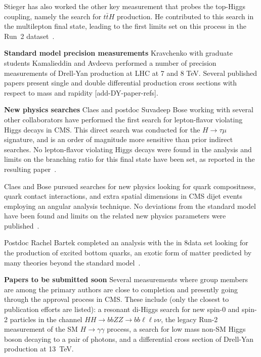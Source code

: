 Stieger has also worked the other key measurement that probes the top-Higgs
coupling, namely the search for $t\bar{t}H$ production.  He contributed to
this search in the multilepton final state, leading to the first limits set
on this process in the Run~2 dataset~\cite{bib:ttHmultilep}.

{\bf Standard model precision measurements} Kravchenko with graduate students Kamalieddin and Avdeeva performed a number of precision measurements of Drell-Yan production at LHC at 7 and 8 TeV. Several published papers present single and double differential production cross sections with respect to mass and rapidity [add-DY-paper-refs].

{\bf New physics searches}
Claes and postdoc Suvadeep Bose working with several other collaborators have performed the first search for lepton-flavor violating Higgs decays in CMS. This direct search was conducted for the $H\rightarrow \tau\mu$ signature, and is an order of magnitude more sensitive than prior indirect searches. No lepton-flavor violating Higgs decays were found in the analysis and limits on the branching ratio for this final state have been set, as reported in the resulting paper~\cite{bib:higgs-LFV}.

Claes and Bose pursued searches for new physics looking for quark compositness, quark contact interactions, and extra spatial dimensions in CMS dijet events employing an angular analysis technique. No deviations from the standard model have been found and limits on the related new physics parameters were published~\cite{bib:quark-compositness-etc}.

Postdoc Rachel Bartek completed an analysis with the in 8\TeV data set looking for the production of excited bottom quarks, an exotic form of matter predicted by many theories beyond the standard model~\cite{bib:bstar}. 

{\bf Papers to be submitted soon} Several measurements where group members are among the primary authors are close to completion and presently going through the approval process in CMS. These include (only the closest to publication efforts are listed): a resonant di-Higgs search for new spin-0 and spin-2 particles in the channel $HH\to bbZZ\to bb\ell\ell\nu\nu$, the legacy Run-2 measurement of the SM $H\to\gamma\gamma$ process, a search for low mass non-SM Higgs boson decaying to a pair of photons, and a differential cross section of Drell-Yan production at 13~TeV. 

